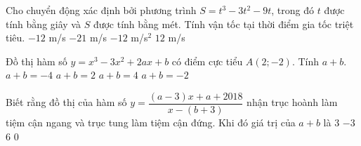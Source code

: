 \begin{ex}%
Cho chuyển động xác định bởi phương trình $S=t^3-3t^2-9t$, trong đó $t$ được tính bằng giây và $S$ được tính bằng mét. Tính vận tốc tại thời điểm gia tốc triệt tiêu.
	\choice
	{\True $-12$ m/s}
	{$-21$ m/s}
	{$-12$ m/s$^2$}
	{$12$ m/s}
\end{ex}

\begin{ex}%
Đồ thị hàm số $y=x^3-3x^2+2ax+b$ có điểm cực tiểu $A(2; -2)$. Tính $a+b$.
	\choice
	{$a+b=-4$}
	{\True $a+b=2$}
	{$a+b=4$}
	{$a+b=-2$}
\end{ex}

\begin{ex}%
Biết rằng đồ thị của hàm số $y=\dfrac{(a-3)x+a+2018}{x-(b+3)}$ nhận trục hoành làm tiệm cận ngang và trục tung làm tiệm cận đứng. Khi đó giá trị của $a+b$ là
	\choice
	{$3$}
	{$-3$}
	{$6$}
	{\True $0$}
\end{ex}

